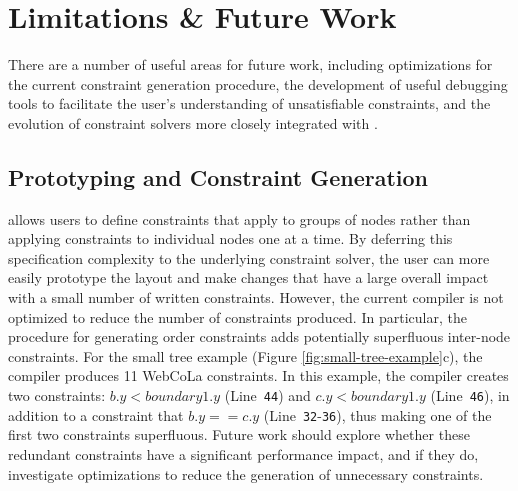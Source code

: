 \section{Limitations \& Future Work}
There are a number of useful areas for future work, including optimizations
for the current constraint generation procedure, the development of useful debugging
tools to facilitate the user's understanding of unsatisfiable constraints,
and the evolution of constraint solvers more closely integrated with \projectname.


\subsection{Prototyping and Constraint Generation}
\projectname allows users to define constraints that apply
to groups of nodes rather than applying constraints to individual
nodes one at a time. By deferring this specification complexity to the underlying constraint
solver, the user can more easily prototype the layout and make changes that
have a large overall impact with a small number of written constraints. However, 
the current \projectname compiler is not optimized to reduce the
number of constraints produced. In particular, the procedure for generating
order constraints adds potentially superfluous inter-node 
constraints. For the small tree example (Figure \ref{fig:small-tree-example}c), 
the \projectname compiler produces 11 WebCoLa constraints.
In this example, the \projectname compiler creates two constraints: $b.y < boundary1.y$ (Line~\texttt{44}) 
and $c.y < boundary1.y$ (Line~\texttt{46}), in addition to a
constraint that $b.y == c.y$ (Line~\texttt{32}-\texttt{36}), thus 
making one of the first two constraints superfluous. 
Future work should explore whether these redundant constraints have a 
significant performance impact, and if they do, investigate 
optimizations to reduce the generation of unnecessary constraints.

